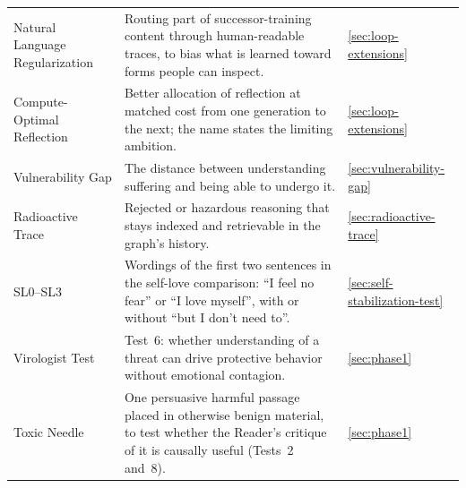 \documentclass[11pt]{article}
\begin{document}
\begin{longtable}{
  >{\raggedright\arraybackslash}p{3.6cm}
  >{\raggedright\arraybackslash}p{9.0cm}
  >{\raggedright\arraybackslash}p{1.6cm}}
Natural Language Regularization & Routing part of successor-training content through human-readable traces, to bias what is learned toward forms people can inspect. & \ref{sec:loop-extensions} \\
Compute-Optimal Reflection & Better allocation of reflection at matched cost from one generation to the next; the name states the limiting ambition. & \ref{sec:loop-extensions} \\
Vulnerability Gap & The distance between understanding suffering and being able to undergo it. & \ref{sec:vulnerability-gap} \\
Radioactive Trace & Rejected or hazardous reasoning that stays indexed and retrievable in the graph's history. & \ref{sec:radioactive-trace} \\
SL0--SL3 & Wordings of the first two sentences in the self-love comparison: \enquote{I feel no fear} or \enquote{I love myself}, with or without \enquote{but I don't need to}. & \ref{sec:self-stabilization-test} \\
Virologist Test & Test~6: whether understanding of a threat can drive protective behavior without emotional contagion. & \ref{sec:phase1} \\
Toxic Needle & One persuasive harmful passage placed in otherwise benign material, to test whether the Reader's critique of it is causally useful (Tests~2 and~8). & \ref{sec:phase1} \\
\end{longtable}
\endgroup
\end{document}
